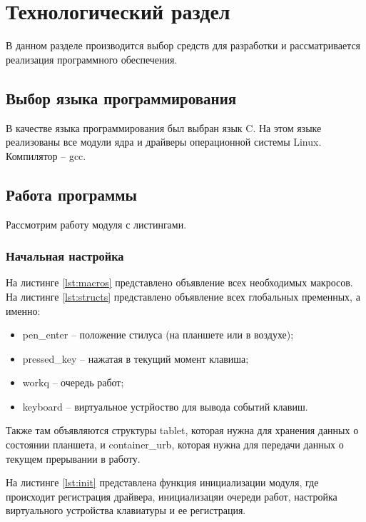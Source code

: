 \chapter{Технологический раздел}
\label{cha:impl}

В данном разделе производится выбор средств для разработки и рассматривается реализация программного обеспечения.

\section{Выбор языка программирования}

В качестве языка программирования был выбран язык C. На этом языке реализованы все модули ядра и драйверы операционной системы Linux. Компилятор -- gcc.

\section{Работа программы}

Рассмотрим работу модуля с листингами.

\subsection{Начальная настройка}

На листинге \ref{lst:macros} представлено объявление всех необходимых макросов. На листинге \ref{lst:structs} представлено объявление всех глобальных пременных, а именно:

\begin{itemize}
    \item pen\_enter -- положение стилуса (на планшете или в воздухе);
    \item pressed\_key -- нажатая в текущий момент клавиша;
    \item workq -- очередь работ;
    \item keyboard -- виртуальное устрйоство для вывода событий клавиш.
\end{itemize}

Также там объявляются структуры tablet, которая нужна для хранения данных о состоянии планшета, и container\_urb, которая нужна для передачи данных о текущем прерывании в работу.

На листинге \ref{lst:init} представлена функция инициализации модуля, где происходит регистрация драйвера, инициализацяи очереди работ, настройка виртуального устройства клавиатуры и ее регистрация.


